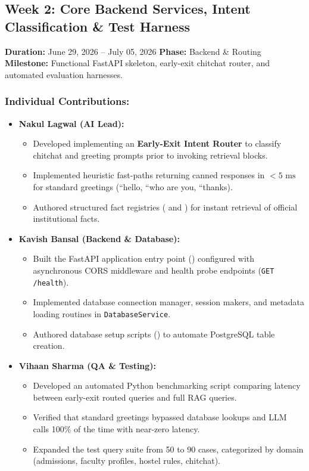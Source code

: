 \documentclass[11pt,a4paper]{article}
\begin{document}
\newpage
\subsection*{Week 2: Core Backend Services, Intent Classification \& Test Harness}
\noindent \textbf{Duration:} June 29, 2026 -- July 05, 2026 \hfill \textbf{Phase:} Backend \& Routing \\
\textbf{Milestone:} Functional FastAPI skeleton, early-exit chitchat router, and automated evaluation harnesses.

\subsubsection*{Individual Contributions:}
\begin{itemize}
    \setlength{\itemsep}{1pt}
    \item \textbf{Nakul Lagwal (AI Lead):}
    \begin{itemize}
        \setlength{\itemsep}{0pt}
        \item Developed  implementing an \textbf{Early-Exit Intent Router} to classify chitchat and greeting prompts prior to invoking retrieval blocks.
        \item Implemented heuristic fast-paths returning canned responses in $<5\text{ ms}$ for standard greetings (``hello, ``who are you, ``thanks).
        \item Authored structured fact registries ( and ) for instant retrieval of official institutional facts.
    \end{itemize}

    \item \textbf{Kavish Bansal (Backend \& Database):}
    \begin{itemize}
        \setlength{\itemsep}{0pt}
        \item Built the FastAPI application entry point () configured with asynchronous CORS middleware and health probe endpoints (\texttt{GET /health}).
        \item Implemented database connection manager, session makers, and metadata loading routines in \texttt{DatabaseService}.
        \item Authored database setup scripts () to automate PostgreSQL table creation.
    \end{itemize}

    \item \textbf{Vihaan Sharma (QA \& Testing):}
    \begin{itemize}
        \setlength{\itemsep}{0pt}
        \item Developed an automated Python benchmarking script comparing latency between early-exit routed queries and full RAG queries.
        \item Verified that standard greetings bypassed database lookups and LLM calls 100\% of the time with near-zero latency.
        \item Expanded the test query suite from 50 to 90 cases, categorized by domain (admissions, faculty profiles, hostel rules, chitchat).
    \end{itemize}
\end{itemize}
\end{document}
